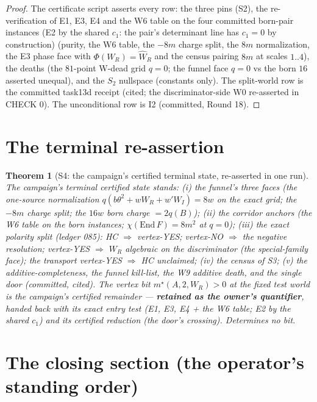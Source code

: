 \documentclass[11pt]{article}
\newtheorem{theorem}{Theorem}
\begin{document}
\begin{proof}
The certificate script asserts every row: the three pins (S2), the re-verification
of E1, E3, E4 and the W6 table on the four committed born-pair instances (E2 by
the shared $c_1$: the pair's determinant line has $c_1=0$ by construction) (purity, the W6
table, the $-8m$ charge split, the $8m$ normalization, the E3 phase face with
$\Phi(W_R)=\hat W_R$ and the census pairing $8m$ at scales $1..4$), the deaths
(the $81$-point W-dead grid $q=0$; the funnel face $q=0$ vs the born $16$
asserted unequal), and the $S_2$ nullspace (constants only). The split-world
row is the committed task13d receipt (cited; the discriminator-side W0
re-asserted in CHECK 0). The unconditional row is I2 (committed, Round 18).
\end{proof}

\section{The terminal re-assertion}

\begin{theorem}[S4: the campaign's certified terminal state, re-asserted in one run]
\label{thm:s4}
The campaign's terminal certified state stands: (i) the funnel's three faces
(the one-source normalization $q(b\theta^2+wW_R+w'W_I)=8w$ on the exact grid;
the $-8m$ charge split; the $16w$ born charge $=2q(B)$); (ii) the corridor
anchors (the W6 table on the born instances; $\chi(\mathrm{End}\,F)=8m^2$ at
$q=0$); (iii) the exact polarity split (ledger 085): HC $\Rightarrow$
vertex-YES; vertex-NO $\Rightarrow$ the negative resolution; vertex-YES
$\Rightarrow$ $W_R$ algebraic \emph{on the discriminator} (the special-family
face); the transport vertex-YES $\Rightarrow$ HC \emph{unclaimed}; (iv) the
census of S3; (v) the additive-completeness, the funnel kill-list, the W9
additive death, and the single door (committed, cited). The vertex bit
$m^\star(A,2,W_R)>0$ at the fixed test world is the campaign's certified
remainder --- \textbf{retained as the owner's quantifier}, handed back with
its exact entry test (E1, E3, E4 + the W6 table; E2 by the shared $c_1$) and its
certified reduction (the door's crossing). \emph{Determines no bit.}
\end{theorem}

\section{The closing section (the operator's standing order)}
\end{document}
